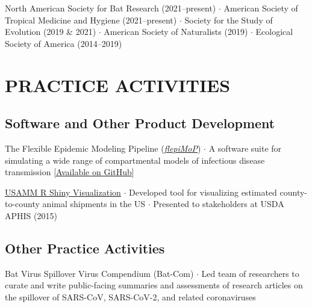 \documentclass{cv}
\begin{document}
North American Society for Bat Research (2021--present) $\cdot$ American Society of Tropical Medicine and Hygiene (2021--present) $\cdot$ Society for the Study of Evolution (2019 \& 2021) $\cdot$ American Society of Naturalists (2019) $\cdot$ Ecological Society of America (2014--2019)






\section*{PRACTICE ACTIVITIES}

\subsection*{Software and Other Product Development}

The Flexible Epidemic Modeling Pipeline (\href{https://www.flepimop.org/}{\textit{flepiMoP}}) $\cdot$ A software suite for simulating a wide range of compartmental models of infectious disease transmission [\href{https://github.com/HopkinsIDD/flepiMoP}{Available on GitHub}]

\href{https://usamm-gen-net.shinyapps.io/usamm-gen-net/}{USAMM R Shiny Visualization} $\cdot$ Developed tool for visualizing estimated county-to-county animal shipments in the US $\cdot$ Presented to stakeholders at USDA APHIS (2015)

\subsection*{Other Practice Activities}

Bat Virus Spillover Virus Compendium (Bat-Com) $\cdot$ Led team of researchers to curate and write public-facing summaries and assessments of research articles on the spillover of SARS-CoV, SARS-CoV-2, and related coronaviruses
\end{document}
